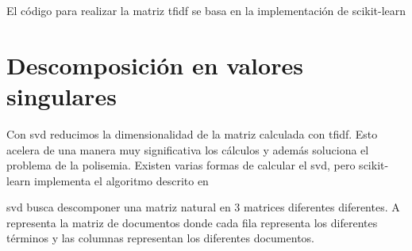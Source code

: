\documentclass[withindex, glossary]{cam-thesis}
\begin{document}
El código para realizar la matriz \acrshort{tfidf} se basa en la implementación de scikit-learn\cite{scikit-learn}

\section{Descomposición en valores singulares}
Con \acrfull{svd} reducimos la dimensionalidad de la matriz calculada con \acrshort{tfidf}. Esto acelera de una manera muy significativa los cálculos y además soluciona el problema de la polisemia. Existen varias formas de calcular el \acrshort{svd}, pero scikit-learn implementa el algoritmo descrito en 

\acrshort{svd} busca descomponer una matriz natural en 3 matrices diferentes diferentes. A representa la matriz de documentos donde cada fila representa los diferentes términos y las columnas representan los diferentes documentos.\cite{stanford-svd}
\end{document}
